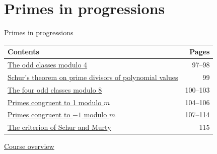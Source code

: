 \documentclass[aspectratio=169,11pt]{beamer}
\begin{document}
\section{Primes in progressions}

\begin{frame}{Primes in progressions}
\small\renewcommand{\arraystretch}{1.35}
\begin{tabular}{p{}r}\textbf{Contents}&\textbf{Pages}\\\midrule
\hyperlink{Navigation97}{The odd classes modulo 4}&97--98\\
\hyperlink{Navigation99}{Schur's theorem on prime divisors of polynomial values}&99\\
\hyperlink{Navigation100}{The four odd classes modulo 8}&100--103\\
\hyperlink{Navigation104}{Primes congruent to 1 modulo $m$}&104--106\\
\hyperlink{Navigation107}{Primes congruent to $-1$ modulo $m$}&107--114\\
\hyperlink{Navigation115}{The criterion of Schur and Murty}&115\\
\end{tabular}\par\medskip\hyperlink{overview}{\color{teal}Course overview}\end{frame}
\end{document}
